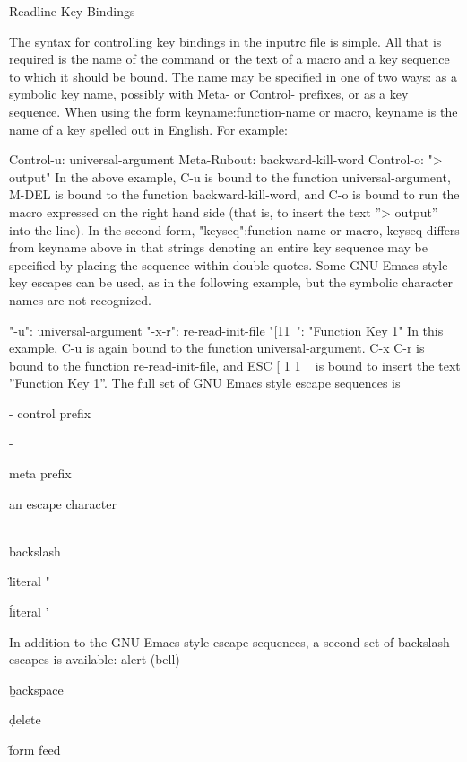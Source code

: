 \documentclass[11pt]{article}
\begin{document}
{{{Readline Key Bindings

The syntax for controlling key bindings in the inputrc file is simple. All that is required is the name of the command or the text of a macro and a key sequence to which it should be bound. The name may be specified in one of two ways: as a symbolic key name, possibly with Meta- or Control- prefixes, or as a key sequence.
When using the form keyname:function-name or macro, keyname is the name of a key spelled out in English. For example:

Control-u: universal-argument
Meta-Rubout: backward-kill-word
Control-o: "> output"
In the above example, C-u is bound to the function universal-argument, M-DEL is bound to the function backward-kill-word, and C-o is bound to run the macro expressed on the right hand side (that is, to insert the text ''> output'' into the line).
In the second form, "keyseq":function-name or macro, keyseq differs from keyname above in that strings denoting an entire key sequence may be specified by placing the sequence within double quotes. Some GNU Emacs style key escapes can be used, as in the following example, but the symbolic character names are not recognized.

"\C-u": universal-argument
"\C-x\C-r": re-read-init-file
"\e[11~": "Function Key 1"
In this example, C-u is again bound to the function universal-argument. C-x C-r is bound to the function re-read-init-file, and ESC [ 1 1 ~ is bound to insert the text ''Function Key 1''.
The full set of GNU Emacs style escape sequences is

\C-
control prefix

\M-

meta prefix

\e

an escape character

\\

backslash

\"

literal "

\'

literal '

In addition to the GNU Emacs style escape sequences, a second set of backslash escapes is available:
\a
alert (bell)

\b

backspace

\d

delete

\f

form feed

}}}
\end{document}
